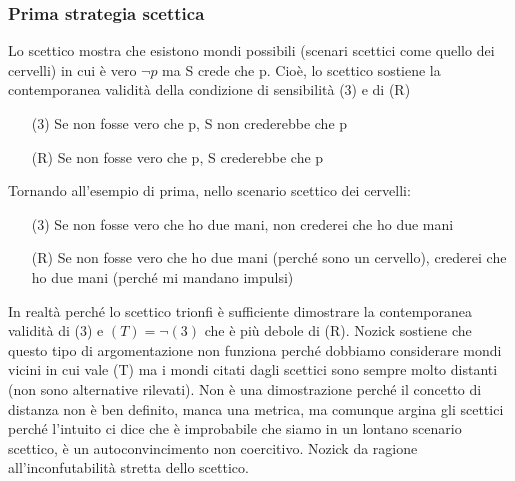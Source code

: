 \documentclass[10pt,a4paper]{article}
\begin{document}
\subsubsection*{Prima strategia scettica}
Lo scettico mostra che esistono mondi possibili (scenari scettici come quello dei cervelli) in cui è vero $\neg p$ ma S crede che p. Cioè, lo scettico sostiene la contemporanea validità della condizione di sensibilità (3) e di (R)
\begin{itemize}
	\item[(3)] Se non fosse vero che p, S non crederebbe che p
	\item[(R)] Se non fosse vero che p, S crederebbe che p 
\end{itemize}
Tornando all'esempio di prima, nello scenario scettico dei cervelli:
\begin{itemize}
	\item[(3)] Se non fosse vero che ho due mani, non crederei che ho due mani
	\item[(R)] Se non fosse vero che ho due mani (perché sono un cervello), crederei che ho due mani (perché mi mandano impulsi)
\end{itemize}
In realtà perché lo scettico trionfi è sufficiente dimostrare la contemporanea validità di (3) e \((T) = \neg (3)\) che è più debole di (R). Nozick sostiene che questo tipo di argomentazione non funziona perché dobbiamo considerare mondi vicini in cui vale (T) ma i mondi citati dagli scettici sono sempre molto distanti (non sono alternative rilevati). Non è una dimostrazione perché il concetto di distanza non è ben definito, manca una metrica, ma comunque argina gli scettici perché l'intuito ci dice che è improbabile che siamo in un lontano scenario scettico, è un autoconvincimento non coercitivo. Nozick da ragione all'inconfutabilità stretta dello scettico.
\end{document}
